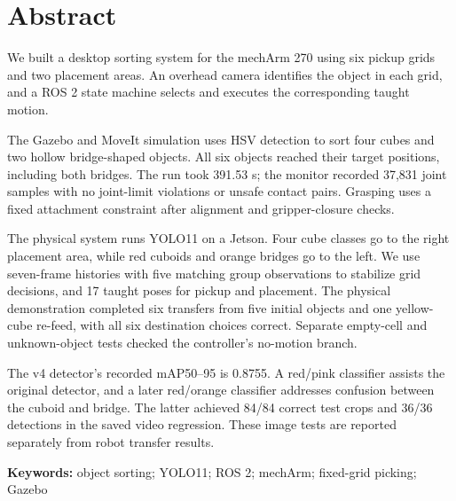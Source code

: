 \section*{Abstract}
We built a desktop sorting system for the mechArm 270 using six pickup grids and two placement areas. An overhead camera identifies the object in each grid, and a ROS 2 state machine selects and executes the corresponding taught motion.

The Gazebo and MoveIt simulation uses HSV detection to sort four cubes and two hollow bridge-shaped objects. All six objects reached their target positions, including both bridges. The run took 391.53 s; the monitor recorded 37,831 joint samples with no joint-limit violations or unsafe contact pairs. Grasping uses a fixed attachment constraint after alignment and gripper-closure checks.

The physical system runs YOLO11 on a Jetson. Four cube classes go to the right placement area, while red cuboids and orange bridges go to the left. We use seven-frame histories with five matching group observations to stabilize grid decisions, and 17 taught poses for pickup and placement. The physical demonstration completed six transfers from five initial objects and one yellow-cube re-feed, with all six destination choices correct. Separate empty-cell and unknown-object tests checked the controller's no-motion branch.

The v4 detector's recorded mAP50--95 is 0.8755. A red/pink classifier assists the original detector, and a later red/orange classifier addresses confusion between the cuboid and bridge. The latter achieved 84/84 correct test crops and 36/36 detections in the saved video regression. These image tests are reported separately from robot transfer results.

\vspace{0.6em}\noindent\textbf{Keywords:} object sorting; YOLO11; ROS 2; mechArm; fixed-grid picking; Gazebo
